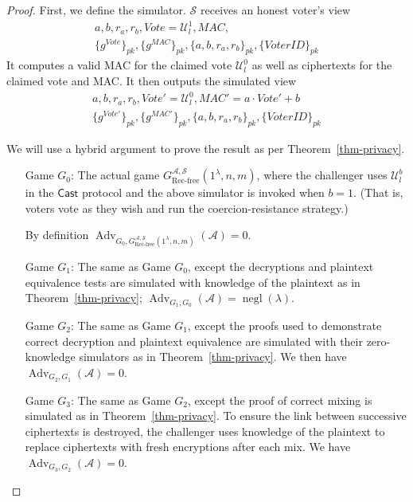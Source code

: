 \documentclass[12pt,a4paper]{article}
\DeclareMathOperator{\negl}{\text{negl}}
\DeclareMathOperator{\Adv}{\text{Adv}}
\theoremstyle{definition}
\newcommand{\Vote}{\mathit{Vote}}
\newcommand{\VoterID}{\mathit{VoterID}}
\newcommand{\Mac}{\mathit{MAC}}
\begin{document}
\begin{proof}
    First, we define the simulator. $\mathcal{S}$ receives an honest voter's view
    \begin{gather*}
        a, b, r_a, r_b, \Vote=\mathcal{U}^1_l, \Mac,\\\{g^\Vote\}_{pk}, \{g^\Mac\}_{pk}, \{a,b,r_a,r_b\}_{pk},\{\VoterID\}_{pk}
    \end{gather*}
    It computes a valid MAC for the claimed vote $\mathcal{U}^0_l$ as well as ciphertexts for the claimed vote and MAC. It then outputs the simulated view
    \begin{gather*}
        a, b, r_a, r_b, \Vote'=\mathcal{U}^0_l, \Mac'=a\cdot\Vote'+b\,\\\{g^{\Vote'}\}_{pk}, \{g^{\Mac'}\}_{pk}, \{a,b,r_a,r_b\}_{pk},\{\VoterID\}_{pk}
    \end{gather*}

    We will use a hybrid argument to prove the result as per Theorem~\ref{thm-privacy}.
    \begin{itemize}[leftmargin=4em]
        \item[Game] $G_0$: The actual game $G^{\mathcal{A},\mathcal{S}}_\text{Rec-free}(1^\lambda,n,m)$, where the challenger uses $\mathcal{U}^b_l$ in the $\mathsf{Cast}$ protocol and the above simulator is invoked when $b=1$.  (That is, voters vote as they wish and run the coercion-resistance strategy.)
        
        By definition $\Adv_{G_0,G^{\mathcal{A},\mathcal{S}}_{\text{Rec-free}}(1^\lambda,n,m)}(\mathcal{A}) = 0$.
    
        \item[Game] $G_1$: The same as Game $G_0$, except the decryptions and plaintext equivalence tests are simulated with knowledge of the plaintext as in Theorem~\ref{thm-privacy}; $\Adv_{G_1, G_0}(\mathcal{A})=\negl(\lambda)$.
    
        \item[Game] $G_2$: The same as Game $G_1$, except the proofs used to demonstrate correct decryption and plaintext equivalence are simulated with their zero-knowledge simulators as in Theorem~\ref{thm-privacy}. We then have $\Adv_{G_2, G_1}(\mathcal{A})=0$.
 
        \item[Game] $G_3$: The same as Game $G_2$, except the proof of correct mixing is simulated as in Theorem~\ref{thm-privacy}. To ensure the link between successive ciphertexts is destroyed, the challenger uses knowledge of the plaintext to replace ciphertexts with fresh encryptions after each mix. We have $\Adv_{G_3, G_2}(\mathcal{A})=0$.
    

\end{itemize}
\end{proof}
\end{document}
